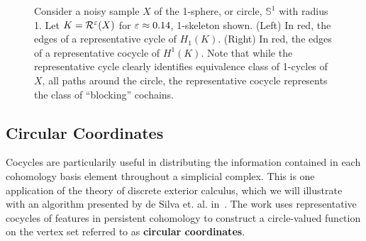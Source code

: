 \begin{figure}[htbp]
    \caption{Consider a noisy sample $X$ of the 1-sphere, or circle, $\mathbb{S}^1$ with radius 1.
            Let $K = \mathcal{R}^\varepsilon(X)$ for $\varepsilon\approx 0.14$, 1-skeleton shown.
            (Left) In red, the edges of a representative cycle of $H_1(K)$.
            (Right) In red, the edges of a representative cocycle of $H^1(K)$.
            Note that while the representative cycle clearly identifies equivalence class of 1-cycles of $X$, all paths around the circle, the representative cocycle represents the class of ``blocking'' cochains.}
    \label{fig:cycles}
\end{figure}

\subsection{Circular Coordinates}

Cocycles are particularily useful in distributing the information contained in each cohomology basis element throughout a simplicial complex.
This is one application of the theory of discrete exterior calculus, which we will illustrate with an algorithm presented by de Silva et. al. in~\cite{desilva09persistent}.
The work uses representative cocycles of features in persistent cohomology to construct a circle-valued function on the vertex set referred to as \textbf{circular coordinates}.

